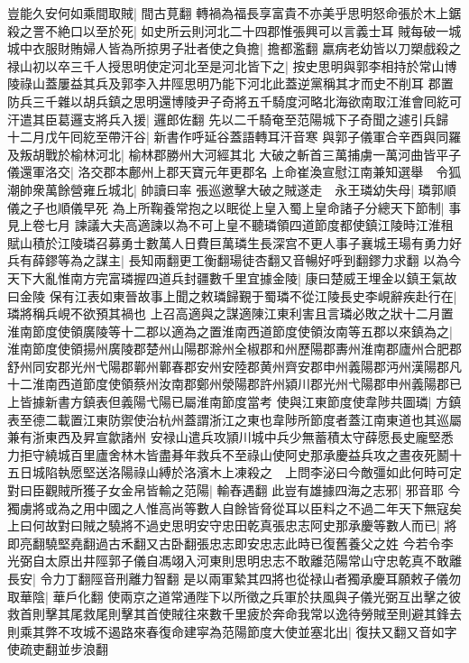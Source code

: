 豈能久安何如乘間取賊|{
	間古莧翻}
轉禍為福長享富貴不亦美乎思明怒命張於木上鋸殺之詈不絶口以至於死|{
	如史所云則河北二十四郡惟張興可以言義士耳}
賊每破一城城中衣服財賄婦人皆為所掠男子壯者使之負擔|{
	擔都濫翻}
羸病老幼皆以刀槊戲殺之禄山初以卒三千人授思明使定河北至是河北皆下之|{
	按史思明與郭李相持於常山博陵祿山蓋屢益其兵及郭李入井陘思明乃能下河北此蓋逆黨稱其才而史不削耳}
郡置防兵三千雜以胡兵鎮之思明還博陵尹子奇將五千騎度河略北海欲南取江淮會囘紇可汗遣其臣葛邏支將兵入援|{
	邏郎佐翻}
先以二千騎奄至范陽城下子奇聞之遽引兵歸　十二月戊午囘紇至帶汗谷|{
	新書作呼延谷蓋語轉耳汗音寒}
與郭子儀軍合辛酉與同羅及叛胡戰於榆林河北|{
	榆林郡勝州大河經其北}
大破之斬首三萬捕虜一萬河曲皆平子儀還軍洛交|{
	洛交郡本鄜州上郡天寶元年更郡名}
上命崔渙宣慰江南兼知選舉　令狐潮帥衆萬餘營雍丘城北|{
	帥讀曰率}
張巡邀擊大破之賊遂走　永王璘幼失母|{
	璘郭順儀之子也順儀早死}
為上所鞠養常抱之以眠從上皇入蜀上皇命諸子分總天下節制|{
	事見上卷七月}
諫議大夫高適諫以為不可上皇不聽璘領四道節度都使鎮江陵時江淮租賦山積於江陵璘召募勇士數萬人日費巨萬璘生長深宫不更人事子襄城王瑒有勇力好兵有薛鏐等為之謀主|{
	長知兩翻更工衡翻瑒徒杏翻又音暢好呼到翻鏐力求翻}
以為今天下大亂惟南方完富璘握四道兵封疆數千里宜據金陵|{
	康曰楚威王埋金以鎮王氣故曰金陵}
保有江表如東晉故事上聞之敕璘歸覲于蜀璘不從江陵長史李峴辭疾赴行在|{
	璘將稱兵峴不欲預其禍也}
上召高適與之謀適陳江東利害且言璘必敗之狀十二月置淮南節度使領廣陵等十二郡以適為之置淮南西道節度使領汝南等五郡以來鎮為之|{
	淮南節度使領揚州廣陵郡楚州山陽郡滁州全椒郡和州歷陽郡夀州淮南郡廬州合肥郡舒州同安郡光州弋陽郡鄿州鄿春郡安州安陸郡黄州齊安郡申州義陽郡沔州漢陽郡凡十二淮南西道節度使領蔡州汝南郡鄭州滎陽郡許州潁川郡光州弋陽郡申州義陽郡已上皆據新書方鎮表但義陽弋陽已屬淮南節度當考}
使與江東節度使韋陟共圖璘|{
	方鎮表至德二載置江東防禦使治杭州蓋謂浙江之東也韋陟所節度者蓋江南東道也其巡屬兼有浙東西及昇宣歙諸州}
安禄山遣兵攻頴川城中兵少無蓄積太守薛愿長史龐堅悉力拒守繞城百里廬舍林木皆盡朞年救兵不至祿山使阿史那承慶益兵攻之晝夜死鬭十五日城陷執愿堅送洛陽祿山縛於洛濱木上凍殺之　上問李泌曰今敵彊如此何時可定對曰臣觀賊所獲子女金帛皆輸之范陽|{
	輸舂遇翻}
此豈有雄據四海之志邪|{
	邪音耶}
今獨虜將或為之用中國之人惟高尚等數人自餘皆脅從耳以臣料之不過二年天下無寇矣上曰何故對曰賊之驍將不過史思明安守忠田乾真張忠志阿史那承慶等數人而已|{
	將即亮翻驍堅堯翻過古禾翻又古卧翻張忠志即安忠志此時已復舊養父之姓}
今若令李光弼自太原出井陘郭子儀自馮翊入河東則思明忠志不敢離范陽常山守忠乾真不敢離長安|{
	令力丁翻陘音刑離力智翻}
是以兩軍縶其四將也從禄山者獨承慶耳願敕子儀勿取華陰|{
	華戶化翻}
使兩京之道常通陛下以所徵之兵軍於扶風與子儀光弼互出擊之彼救首則擊其尾救尾則擊其首使賊往來數千里疲於奔命我常以逸待勞賊至則避其鋒去則乘其弊不攻城不遏路來春復命建寜為范陽節度大使並塞北出|{
	復扶又翻又音如字使疏吏翻並步浪翻}
